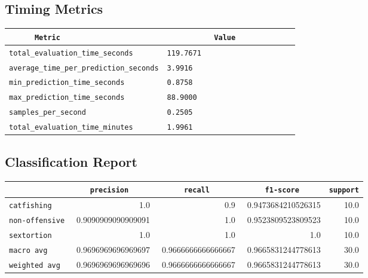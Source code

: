 \documentclass{article}
\begin{document}
\subsection{Timing Metrics}

\begin{center}
\begin{tabular}{l | l} \hline
    \verb|      Metric     | & \verb|           Value           | \\ \hline
    \hline
    \verb|total_evaluation_time_seconds| & \verb|119.7671                     | \\ \hline
    \verb|average_time_per_prediction_seconds| & \verb|3.9916                       | \\ \hline
    \verb|min_prediction_time_seconds| & \verb|0.8758                       | \\ \hline
    \verb|max_prediction_time_seconds| & \verb|88.9000                      | \\ \hline
    \verb|samples_per_second| & \verb|0.2505                       | \\ \hline
    \verb|total_evaluation_time_minutes| & \verb|1.9961                       | \\ \hline
\end{tabular}
\end{center}

\subsection{Classification Report}

\begin{center}
\begin{tabular}{l | r | r | r | r} \hline
    \verb|            | & \verb|    precision     | & \verb|      recall      | & \verb|     f1-score     | & \verb|support| \\ \hline
    \hline
    \verb|catfishing | & 1.0 & 0.9 & 0.9473684210526315 &    10.0 \\ \hline
    \verb|non-offensive| & 0.9090909090909091 & 1.0 & 0.9523809523809523 &    10.0 \\ \hline
    \verb|sextortion | & 1.0 & 1.0 & 1.0 &    10.0 \\ \hline
    \verb|macro avg  | & 0.9696969696969697 & 0.9666666666666667 & 0.9665831244778613 &    30.0 \\ \hline
    \verb|weighted avg| & 0.9696969696969696 & 0.9666666666666667 & 0.9665831244778613 &    30.0 \\ \hline
\end{tabular}
\end{center}
\end{document}
